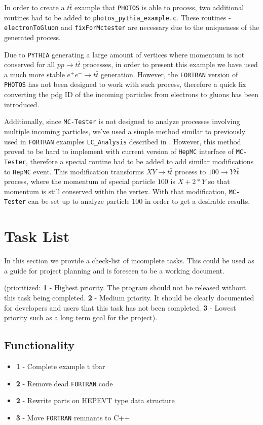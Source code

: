 \documentclass[]{Photos_interface_design}
\begin{document}
In order to create a $t \bar t$ example that {\tt PHOTOS} is able to process,
two additional routines had to be added to {\tt photos\_pythia\_example.c}.
These routines - {\tt electronToGluon} and {\tt fixForMctester} are necessary
due to the uniqueness of the generated process.

Due to {\tt PYTHIA} generating a large amount of vertices where momentum is not
conserved for all $p p \rightarrow t \bar t$ processes, in order to present this
example we have used a much more stable $e^+ e^- \rightarrow t \bar t$
generation. However, the {\tt FORTRAN} version of {\tt PHOTOS} has not been designed
to work with such process, therefore a quick fix converting the pdg ID of
the incoming particles from electrons to gluons has been introduced.

Additionally, since {\tt MC-Tester} is not designed to analyze processes involving
multiple incoming particles, we've used a simple method similar to previously
used in {\tt FORTRAN} examples {\tt LC\_Analysis} described in \cite{??}. However,
this method proved to be hard to implement with current version of {\tt HepMC}
interface of {\tt MC-Tester}, therefore a special routine had to be added
to add similar modifications to {\tt HepMC} event. This modification transforms
$X Y \rightarrow t \bar t$ process to $100 \rightarrow Y t \bar t$ process,
where the momentum of special particle $100$ is $X + 2*Y$ so that momentum is still
conserved within the vertex. With that modification, {\tt MC-Tester} can be set up
to analyze particle $100$ in order to get a desirable results.

\newpage

\section*{Task List}
In this section we provide a check-list of incomplete tasks.
This could be used as a guide for project planning and is foreseen
to be a working document. 

(prioritized: {\bf 1} - Highest priority. The program should not be
released without this task being completed. {\bf 2} - Medium priority.
It should be clearly documented for developers and users that this task has not
been completed. {\bf 3} - Lowest priority such as a long term goal 
for the project).

\subsection*{Functionality}
\begin{itemize}
  \item[\ding{111}]{\bf 1} - Complete example t tbar
  \item[\ding{111}]{\bf 2} - Remove dead {\tt FORTRAN} code
  \item[\ding{111}]{\bf 2} - Rewrite parts on HEPEVT type data structure
  \item[\ding{111}]{\bf 3} - Move {\tt FORTRAN} remnants to C++
\end{itemize}
\end{document}
